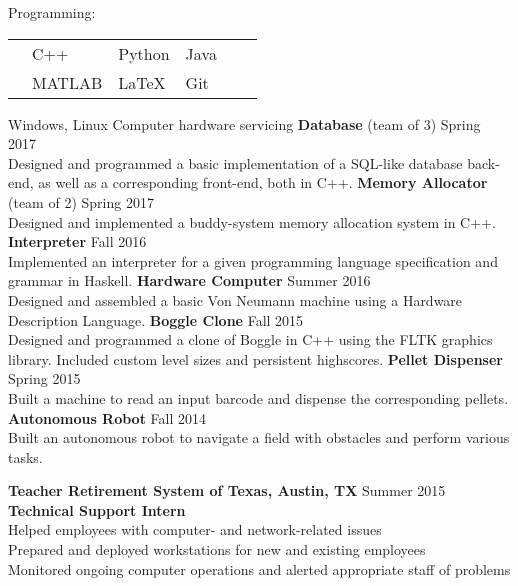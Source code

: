 \documentclass[12pt]{article}
\begin{document}
\begin{flushleft}
\begin{outline}[compactitem]
    \1 Programming: 
    \\
    \vspace{-\baselineskip}\vspace{-\upspacelength}
    \begin{tabularx}{\textwidth}{X X X X X X}
      & C++   & Python & Java\upspace \\
      & MATLAB& LaTeX & Git\upspace \\
    \end{tabularx}
    \vspace{-5px}\upspace
    \1 
    Windows, Linux
    \hfill{}\hspace{1px}
    Computer hardware servicing
    \hfill\hfill
      \1 \textbf{Database} (team of 3) \hfill Spring 2017
      \\ Designed and programmed a basic implementation of a SQL-like database back-end, as well as a corresponding front-end, both in C++.
      \1 \textbf{Memory Allocator} (team of 2) \hfill Spring 2017
      \\ Designed and implemented a buddy-system memory allocation system in C++.
      \1 \textbf{Interpreter} \hfill Fall 2016
      \\ Implemented an interpreter for a given programming language specification and grammar in Haskell.
      \1 \textbf{Hardware Computer} \hfill Summer 2016
      \\ Designed and assembled a basic Von Neumann machine using a Hardware Description Language.
      \1 \textbf{Boggle Clone} \hfill Fall 2015
      \\ Designed and programmed a clone of Boggle in C++ using the FLTK graphics library. Included custom level sizes and persistent highscores.
      \1 \textbf{Pellet Dispenser} \hfill Spring 2015
      \\ Built a machine to read an input barcode and dispense the corresponding pellets.
      \1 \textbf{Autonomous Robot} \hfill Fall 2014
      \\ Built an autonomous robot to navigate a field with obstacles and perform various tasks.

    \1 \textbf{Teacher Retirement System of Texas, Austin, TX} \hfill Summer 2015
    \\ \textbf{Technical Support Intern}
    \\ Helped employees with computer- and network-related issues
    \\ Prepared and deployed workstations for new and existing employees
    \\ Monitored ongoing computer operations and alerted appropriate staff of problems


\end{outline}
\end{flushleft}
\end{document}
